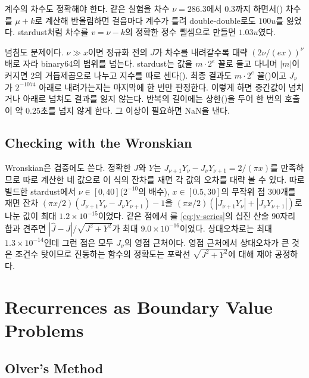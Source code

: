 계수의 차수도 정확해야 한다. 같은 실험을 차수 $\nu=286.3$에서 $0.3$까지 하면서() 차수를 $\mu+k$로 계산해 반올림하면 걸음마다 계수가 틀려 double-double로도 $100u$를 잃었다. stardust처럼 차수를 $v=\nu-k$의 정확한 정수 뺄셈으로 만들면 $1.03u$였다.

넘침도 문제이다. $\nu\gg x$이면 정규화 전의 $J$가 차수를 내려갈수록 대략 $(2\nu/(ex))^\nu$배로 자라 binary64의 범위를 넘는다. stardust는 값을 $m\cdot2^e$ 꼴로 들고 다니며 $|m|$이 커지면 $2$의 거듭제곱으로 나누고 지수를 따로 센다(). 최종 결과도 $m\cdot2^e$ 꼴()이고 $J_\nu$가 $2^{-1074}$ 아래로 내려가는지는 마지막에 한 번만 판정한다. 이렇게 하면 중간값이 넘치거나 아래로 넘쳐도 결과를 잃지 않는다. 반복의 길이에는 상한()을 두어 한 번의 호출이 약 $0.25$초를 넘지 않게 한다. 그 이상이 필요하면 NaN을 낸다.

\subsection{Checking with the Wronskian}

Wronskian은 검증에도 쓴다. 정확한 $J$와 $Y$는 $J_{\nu+1}Y_\nu-J_\nu Y_{\nu+1}=2/(\pi x)$를 만족하므로 따로 계산한 네 값으로 이 식의 잔차를 재면 각 값의 오차를 대략 볼 수 있다. 따로 빌드한 stardust에서 $\nu\in[0,40]$($2^{-10}$의 배수), $x\in[0.5,30]$의 무작위 점 $300$개를 재면 잔차 $(\pi x/2)(J_{\nu+1}Y_\nu-J_\nu Y_{\nu+1})-1$을 $(\pi x/2)(|J_{\nu+1}Y_\nu|+|J_\nu Y_{\nu+1}|)$로 나눈 값이 최대 $1.2\times10^{-15}$이었다. 같은 점에서 를 \cref{eq:jv-series}의 십진 산술 $90$자리 합과 견주면 $|\hat J-J|/\sqrt{J^2+Y^2}$가 최대 $9.0\times10^{-16}$이었다. 상대오차로는 최대 $1.3\times10^{-14}$인데 그런 점은 모두 $J_\nu$의 영점 근처이다. 영점 근처에서 상대오차가 큰 것은 조건수 탓이므로 진동하는 함수의 정확도는 포락선 $\sqrt{J^2+Y^2}$에 대해 재야 공정하다.


\section{Recurrences as Boundary Value Problems}
\label{sec:olver}

\subsection{Olver's Method}

